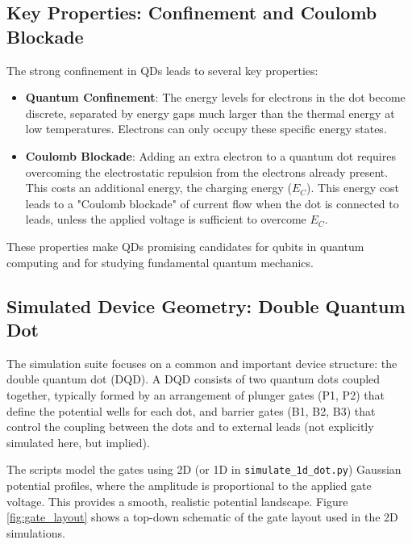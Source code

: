 \documentclass{article}
\begin{document}
\subsection{Key Properties: Confinement and Coulomb Blockade}
The strong confinement in QDs leads to several key properties:
\begin{itemize}
    \item \textbf{Quantum Confinement}: The energy levels for electrons in the dot become discrete, separated by energy gaps much larger than the thermal energy at low temperatures. Electrons can only occupy these specific energy states.
    \item \textbf{Coulomb Blockade}: Adding an extra electron to a quantum dot requires overcoming the electrostatic repulsion from the electrons already present. This costs an additional energy, the charging energy ($E_C$). This energy cost leads to a "Coulomb blockade" of current flow when the dot is connected to leads, unless the applied voltage is sufficient to overcome $E_C$.
\end{itemize}
These properties make QDs promising candidates for qubits in quantum computing and for studying fundamental quantum mechanics.

\subsection{Simulated Device Geometry: Double Quantum Dot}
The simulation suite focuses on a common and important device structure: the double quantum dot (DQD). A DQD consists of two quantum dots coupled together, typically formed by an arrangement of plunger gates (P1, P2) that define the potential wells for each dot, and barrier gates (B1, B2, B3) that control the coupling between the dots and to external leads (not explicitly simulated here, but implied).

The scripts model the gates using 2D (or 1D in \texttt{simulate\_1d\_dot.py}) Gaussian potential profiles, where the amplitude is proportional to the applied gate voltage. This provides a smooth, realistic potential landscape. Figure \ref{fig:gate_layout} shows a top-down schematic of the gate layout used in the 2D simulations.
\end{document}
